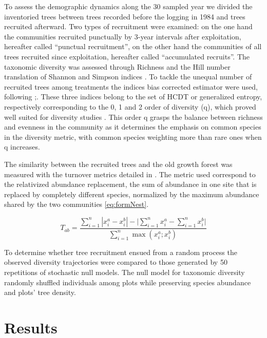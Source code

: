 \documentclass[fleqn,10pt]{ArtEcoFoG} %
\begin{document}
To assess the demographic dynamics along the 30 sampled year we divided
the inventoried trees between trees recorded before the logging in 1984
and trees recruited afterward. Two types of recruitment were examined:
on the one hand the communities recruited punctually by 3-year intervals
after exploitation, hereafter called ``punctual recruitment'', on the
other hand the communities of all trees recruited since exploitation,
hereafter called ``accumulated recruits''. The taxonomic diversity was
assessed through Richness and the Hill number translation of Shannon and
Simpson indices \citep{Hill1973}. To tackle the unequal number of
recruited trees among treatments the indices bias corrected estimator
were used, following \citet{chao2015estimating};\citet{Marcon2015b}.
These three indices belong to the set of HCDT or generalized entropy,
respectively corresponding to the 0, 1 and 2 order of diversity (q),
which proved well suited for diversity studies
\citep{Patil1982, Tothmeresz1995}. This order q grasps the balance
between richness and evenness in the community as it determines the
emphasis on common species in the diversity metric, with common species
weighting more than rare ones when q increases.

The similarity between the recruited trees and the old growth forest was
measured with the turnover metrics detailed in \citet{Podani2013a}. The
metric used correspond to the relativized abundance replacement, the sum
of abundance in one site that is replaced by completely different
species, normalized by the maximum abundance shared by the two
communities \eqref{eq:formNest}.

\begin{equation}
T_{ab}=\frac{\sum_{i=1}^{n}|x_i^a - x_i^b| - \bigg| \sum_{i=1}^{n}{x_i^a} - \sum_{i=1}^{n}{x_i^b} \bigg|}{\sum_{i=1}^{n}\max{\left( x_i^a;x_i^b \right)}}
\label{eq:formNest}
\end{equation}

To determine whether tree recruitment ensued from a random process the
observed diversity trajectories were compared to those generated by 50
repetitions of stochastic null models. The null model for taxonomic
diversity randomly shuffled individuals among plots while preserving
species abundance and plots' tree density.

\section{Results}\label{results}
\end{document}
